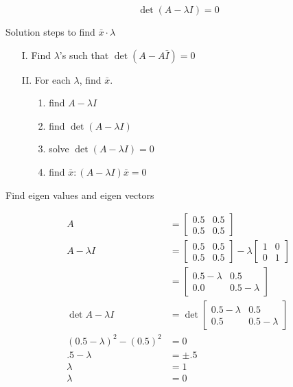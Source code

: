\documentclass[main.tex]{subfiles}
\begin{document}
    $$\operatorname{det}(A-\lambda I)=0$$
    
    Solution steps to find $\bar{x} \cdot \lambda$
    
    \begin{enumerate}
        \item [I.] Find $\lambda$'s such that $\operatorname{det}(A-A \bar{I})=0$
        \item [II.] For each $\lambda$, find $\bar{x}$.
        \begin{enumerate}
            \item[1.] find $A-\lambda I$
            \item[2.] find  $\operatorname{det}(A-\lambda I)$
            \item[3.] solve $\operatorname{det}(A-\lambda I)=0$
            \item[4.] find $\bar{x}:(A-\lambda I) \bar{x}=0$
        \end{enumerate}
    \end{enumerate}
    
    Find eigen values and eigen vectors
    
    $$
    \begin{aligned}
    A&=\left[\begin{array}{ll}
    0.5 & 0.5 \\
    0.5 & 0.5
    \end{array}\right]\\
    A-\lambda I &=\left[\begin{array}{ll}
    0.5 & 0.5 \\
    0.5 & 0.5
    \end{array}\right]-\lambda\left[\begin{array}{ll}
    1 & 0 \\
    0 & 1
    \end{array}\right] \\
    &=\left[\begin{array}{ll}
    0.5-\lambda & 0.5 \\
    0.0 & 0.5-\lambda
    \end{array}\right]\\
    \operatorname{det} A-\lambda I &=\operatorname{det}\left[\begin{array}{cc}
    0.5-\lambda & 0.5 \\
    0.5 & 0.5-\lambda
    \end{array}\right] \\
    (0.5-\lambda)^{2}-(0.5)^{2} & = 0 \\
    .5-\lambda&=\pm .5 \\
    \lambda&=1\\
    \lambda&=0\\
    \end{aligned}
    $$
    
\end{document}
